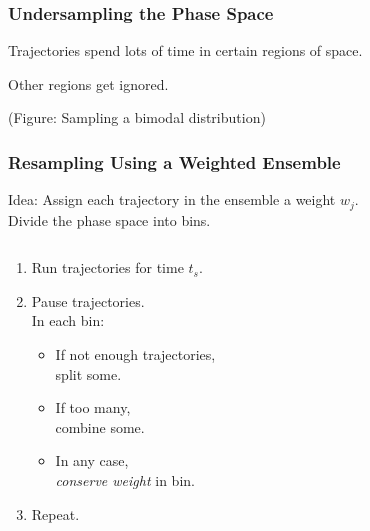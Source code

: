 \documentclass[xcolor={usenames,dvipsnames,svgnames}]{beamer}
\begin{document}
\begin{frame}
    \frametitle{Undersampling the Phase Space}
    Trajectories spend lots of time in certain regions of space.

    Other regions get ignored.

    (Figure: Sampling a bimodal distribution)
\end{frame}

\begin{frame}
    \frametitle{Resampling Using a Weighted Ensemble}
    Idea: Assign each trajectory in the ensemble a weight $w_j$.\\
    Divide the phase space into bins.
    \begin{columns}[t]
        \begin{column}{0.5\textwidth}
            \begin{enumerate}
                \item<2-> Run trajectories for time $t_s$.
                \item<2-> Pause trajectories.\\
                    In each bin:
                \begin{itemize}
                    \item<3-> If not enough trajectories,\\
                        split some.
                    \item<4-> If too many,\\
                        combine some.
                    \item<5-> In any case,\\
                        \emph{conserve weight} in bin.
                \end{itemize}
                \item<6-> Repeat.
            \end{enumerate}
        \end{column}
        \begin{column}[T]{0.5\textwidth}
            \begin{center}
                \begin{overprint}
                    
                    
                    
                    
                    
                \end{overprint}
            \end{center}
        \end{column}
    \end{columns}
\end{frame}
\end{document}
